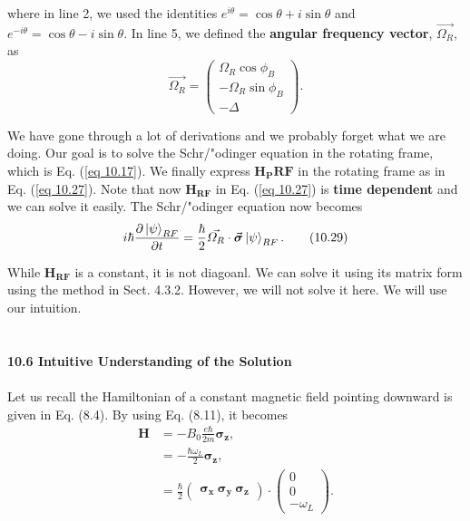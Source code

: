\documentclass{article}
\begin{document}
where in line 2, we used the identities $e^{i\theta}=\cos\theta+i\sin\theta$ and
$e^{-i\theta}=\cos\theta-i\sin\theta$. In line 5, we defined the \textbf{angular frequency vector},
$\vec{\varOmega_R}$, as
\begin{equation}\label{eq 10.28}
    \vec{\varOmega_R}= \begin{pmatrix}
        \varOmega_R\cos\phi_B\\
        -\varOmega_R\sin\phi_B\\
        -\varDelta 
    \end{pmatrix}.\tag{10.28}
\end{equation}

We have gone through a lot of derivations and we probably forget what we are
doing. Our goal is to solve the Schr/"{o}dinger equation in the rotating frame, which is
Eq. (\ref{eq 10.17}). We finally express $\boldsymbol{H_P{RF}}$ in the rotating frame as in
Eq. (\ref{eq 10.27}). Note that now $\boldsymbol{H_{RF}}$ in Eq. (\ref{eq 10.27}) is 
\textbf{time dependent} and we can solve it easily. The Schr/"{o}dinger equation now becomes
\begin{equation}\label{eq 10.29}
    i\hbar\frac{\partial \ket{\psi}_{RF}}{\partial t}=\frac{\hbar}{2}\vec{\varOmega_R}\cdot\vec{\boldsymbol{\sigma}}\ket{\psi}_{RF}. \tag{10.29}
\end{equation}

While $\boldsymbol{H_{RF}}$ is a constant, it is not diagoanl. We can solve it using its matrix form
using the method in Sect. 4.3.2. However, we will not solve it here. We will use our intuition.\\\\\\
\textbf{\large 10.6 Intuitive Understanding of the Solution}\\\\
Let us recall the Hamiltonian of a constant magnetic field pointing downward is
given in Eq. (8.4). By using Eq. (8.11), it becomes
\begin{align*}\label{eq 10.30}
    \boldsymbol{H}&=-B_0\frac{e\hbar}{2m}\boldsymbol{\sigma_z},\\
    &= -\frac{\hbar\omega_L}{2}\boldsymbol{\sigma_z},\\
    &=\frac{\hbar}{2}\begin{pmatrix}
        \boldsymbol{\sigma_x}\ \boldsymbol{\sigma_y}\ \boldsymbol{\sigma_z} 
    \end{pmatrix}\cdot
    \begin{pmatrix}
        0\\0\\ -\omega_L
    \end{pmatrix}. \tag{10.30}
\end{align*}
\end{document}
